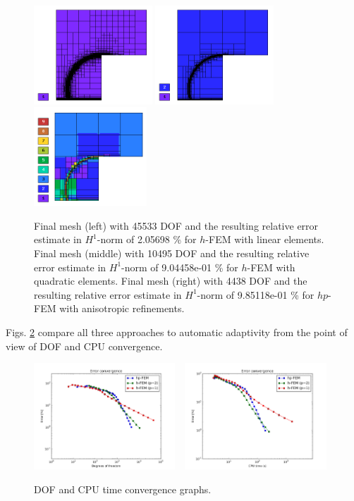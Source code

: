\documentclass[12pt]{elsarticle}
\begin{document}
\begin{figure}[H]
\centering
\includegraphics[height=3.7cm]{nist/nist-12/mesh_h1_aniso.png}
\includegraphics[height=3.7cm]{nist/nist-12/mesh_h2_aniso.png}
\includegraphics[height=3.7cm]{nist/nist-12/mesh_hp_aniso.png}
\caption{
Final mesh (left) with 45533 DOF and the resulting
relative error estimate in $H^1$-norm of 2.05698 \% for $h$-FEM with linear elements.
Final mesh (middle) with 10495 DOF and the resulting
relative error estimate in $H^1$-norm of 9.04458e-01 \% for $h$-FEM with quadratic elements.
Final mesh (right) with 4438 DOF and the resulting
relative error estimate in $H^1$-norm of 9.85118e-01 \% for $hp$-FEM with anisotropic refinements.}
\label{fig:nist-12-hp-aniso}
\end{figure}

Figs. \ref{fig:nist-12-conv} compare all
three approaches to automatic adaptivity from the point
of view of DOF and CPU convergence.

\begin{figure}[!ht]
\centering
\includegraphics[height=4cm]{nist/nist-12/conv_dof_aniso.png}\ \
\includegraphics[height=4cm]{nist/nist-12/conv_cpu_aniso.png}
\caption{DOF and CPU time convergence graphs.}
\label{fig:nist-12-conv}
\end{figure}
\end{document}
